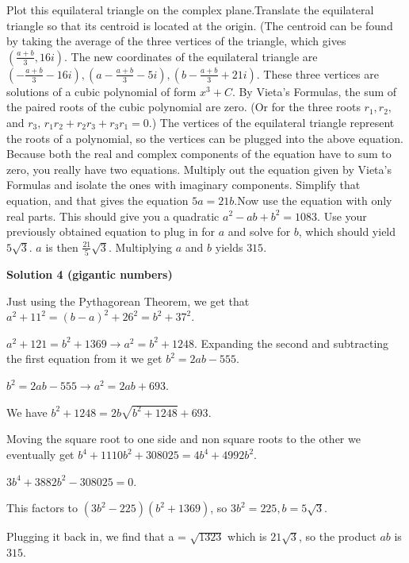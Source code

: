 \begin{enumerate}
Plot this equilateral triangle on the complex plane.Translate the equilateral triangle so that its centroid is located at the origin. (The centroid can be found by taking the average of the three vertices of the triangle, which gives $\left(\frac{a+b}{3}, 16i\right)$. The new coordinates of the equilateral triangle are $\left(-\frac{a+b}{3}-16i\right), \left(a-\frac{a+b}{3}-5i\right), \left(b-\frac{a+b}{3}+21i\right)$. These three vertices are solutions of a cubic polynomial of form $x^3 + C$. By Vieta's Formulas, the sum of the paired roots of the cubic polynomial are zero. (Or for the three roots $r_1, r_2,$ and $r_3,$$\, r_1r_2 + r_2r_3 + r_3r_1 = 0$.) The vertices of the equilateral triangle represent the roots of a polynomial, so the vertices can be plugged into the above equation. Because both the real and complex components of the equation have to sum to zero, you really have two equations. Multiply out the equation given by Vieta's Formulas and isolate the ones with imaginary components. Simplify that equation, and that gives the equation $5a = 21b.$Now use the equation with only real parts. This should give you a quadratic $a^2 - ab + b^2 = 1083$. Use your previously obtained equation to plug in for $a$ and solve for $b$, which should yield $5\sqrt{3}$. $a$ is then $\frac{21}{5}\sqrt{3}$. Multiplying $a$ and $b$ yields $\boxed{315}$.

 



\textbf{Solution 4 (gigantic numbers)}

Just using the Pythagorean Theorem, we get that $a^2 + 11^2 = (b-a)^2 + 26^2 = b^2 + 37^2$. 

 $a^2 + 121 = b^2 + 1369 \longrightarrow a^2 = b^2 + 1248$. Expanding the second and subtracting the first equation from it we get $b^2 = 2ab - 555$.

 $b^2 = 2ab - 555 \longrightarrow a^2 = 2ab + 693$. 

 We have $b^2 + 1248 = 2b\sqrt{b^2+1248} + 693$. 

 Moving the square root to one side and non square roots to the other we eventually get $b^4 + 1110b^2 + 308025 = 4b^4 + 4992b^2$. 

 $3b^4 + 3882b^2 - 308025 = 0$. 

 This factors to $(3b^2-225)(b^2+1369)$, so $3b^2 = 225, b = 5\sqrt 3$. 

 Plugging it back in, we find that a = $\sqrt{1323}$ which is $21\sqrt3$, so the product $ab$ is $\boxed {315}$.

 



\end{enumerate}
